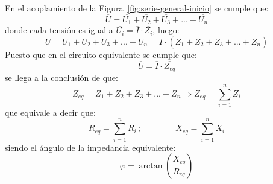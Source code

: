 En el acoplamiento de la Figura~\ref{fig:serie-general-inicio} se
cumple que:
\begin{equation*}
  \overline{U}=\overline{U_1}+\overline{U_2}+\overline{U_3}+...+\overline{U_n}
\end{equation*}
donde cada tensión es igual a
$\overline{U_i}=\overline{I}\cdot\overline{Z_i}$, luego:
\begin{equation*}
  \overline{U}=\overline{U_1}+\overline{U_2}+\overline{U_3}+...+\overline{U_n}=\overline{I} \cdot(\overline{Z_1}+\overline{Z_2}+\overline{Z_3}+...+\overline{Z_n})
\end{equation*}
Puesto que en el circuito equivalente se cumple que:
\begin{equation*}
  \overline{U}=\overline{I}\cdot\overline{Z_{eq}}
\end{equation*}
se llega a la conclusión de que:
\begin{equation}
  \overline{Z_{eq}}=\overline{Z_1}+\overline{Z_2}+\overline{Z_3}+...+\overline{Z_n}\Rightarrow \boxed{\overline{Z_{eq}}=\sum_{i=1}^n \overline{Z_i}}
\end{equation}
que equivale a decir que:
\begin{equation*}
  R_{eq}=\sum_{i=1}^n R_i\,;\qquad \qquad X_{eq}=\sum_{i=1}^n X_i
\end{equation*}
siendo el ángulo de la impedancia equivalente:
\begin{equation*}
  \varphi=\arctan\left(\dfrac{X_{eq}}{R_{eq}}\right)
\end{equation*}
	
